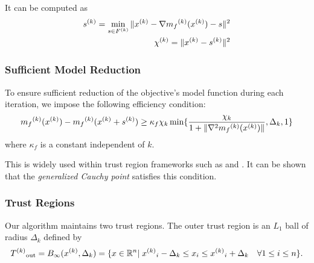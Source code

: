 
It can be computed as 
\begin{align}
\label{critical}
{s}^{(k)} = \min_{s \in {F}^{(k)}} \|{x}^{(k)} - \nabla {{m}_f}^{(k)}({x}^{(k)}) - s\|^2 \\
{\chi^{(k)}} = \|{x}^{(k)} - {s}^{(k)} \|^2 \\
\end{align}



\subsubsection{Sufficient Model Reduction}

To ensure sufficient reduction of the objective's model function during each iteration, we impose the following efficiency condition:
\begin{equation}
\label{efficiency}
{{m}_f}^{(k)}({x}^{(k)}) - {{m}_f}^{(k)}({x}^{(k)} + {s}^{(k)}) \ge \kappa_f \chi_k \min\{ \frac{\chi_k}{1+\|\nabla^2 {{m}_f}^{(k)}({x}^{(k)})\|}, \Delta_k, 1 \}
\end{equation}
where $\kappa_f$ is a constant independent of $k$.

This is widely used within trust region frameworks such as \cite{Conejo:2013:GCT:2620806.2621814} and \cite{Conn:2000:TM:357813}.
It can be shown that the \emph{generalized Cauchy point} satisfies this condition.


\subsubsection{Trust Regions}
Our algorithm maintains two trust regions.
The outer trust region is an $L_1$ ball of radius $\Delta_k$ defined by
\begin{equation}
\label{trust_region}
{T^{(k)}}_{\text{out}} = B_{\infty}({x}^{(k)},\Delta_k) = \{x\in \mathbb R^n | \; {{x}^{(k)}}_i - \Delta_k \le x_i \le {{x}^{(k)}}_i + \Delta_k \quad \forall 1\le i \le n\}.
\end{equation}

